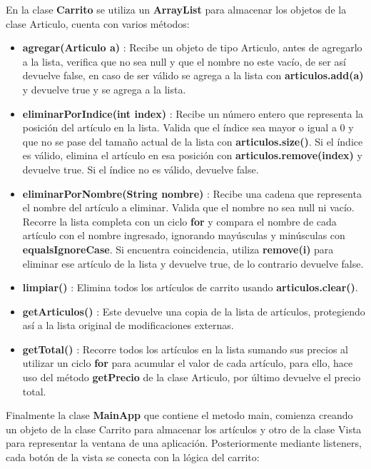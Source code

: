 \documentclass[letterpaper,12pt]{article}
\begin{document}
En la clase \textbf{Carrito} se utiliza un \textbf{ArrayList} para almacenar los objetos de la clase Articulo, cuenta con varios métodos:
\begin{itemize}
    \item \textbf{agregar(Articulo a)} : Recibe un objeto de tipo Articulo, antes de agregarlo a la lista, verifica que no sea null y que el nombre no este vacío, de ser así devuelve false, en caso de ser válido se agrega a la lista con \textbf{articulos.add(a)} y devuelve true y se agrega a la lista.
    \item \textbf{eliminarPorIndice(int index)} : Recibe un número entero que representa la posición del artículo en la lista. Valida que el índice sea mayor o igual a 0 y que no se pase del tamaño actual de la lista con \textbf{articulos.size()}. Si el índice es válido, elimina el artículo en esa posición con \textbf{articulos.remove(index)} y devuelve true. Si el índice no es válido, devuelve false.
    \item \textbf{eliminarPorNombre(String nombre)} : Recibe una cadena que representa el nombre del artículo a eliminar. Valida que el nombre no sea null ni vacío. Recorre la lista completa con un ciclo \textbf{for} y compara el nombre de cada artículo con el nombre ingresado, ignorando mayúsculas y minúsculas con \textbf{equalsIgnoreCase}. Si encuentra coincidencia, utiliza \textbf{remove(i)} para eliminar ese artículo de la lista y devuelve true, de lo contrario devuelve false.
    \item \textbf{limpiar()} : Elimina todos los artículos de carrito usando \textbf{articulos.clear()}.
    \item \textbf{getArticulos()} : Este devuelve una copia de la lista de artículos, protegiendo así a la lista original de modificaciones externas.
    \item \textbf{getTotal()} : Recorre todos los artículos en la lista sumando sus precios al utilizar un ciclo \textbf{for} para acumular el valor de cada artículo, para ello, hace uso del método \textbf{getPrecio} de la clase Articulo, por último devuelve el precio total.
\end{itemize}
Finalmente la clase \textbf{MainApp} que contiene el metodo main, comienza creando un objeto de la clase Carrito para almacenar los artículos y otro de la clase Vista para representar la ventana de una aplicación. Posteriormente mediante listeners, cada botón de la vista se conecta con la lógica del carrito: 
\end{document}
